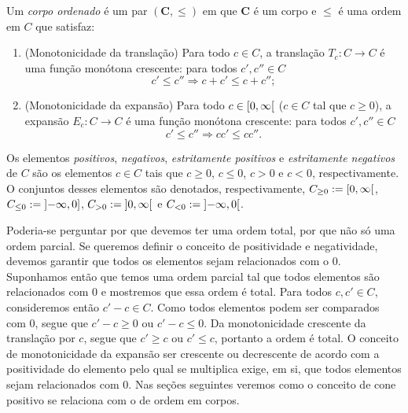 \begin{definition}
Um \emph{corpo ordenado} é um par $(\bm C, \leq)$ em que $\bm C$ é um corpo e $\leq$ é uma ordem em $C$ que satisfaz:
	\begin{enumerate}
	\item (Monotonicidade da translação) Para todo $c \in C$, a translação $T_c\colon C \to C$ é uma função monótona crescente: para todos $c',c'' \in C$
		\begin{equation*}
		c' \leq c'' \Rightarrow c+c' \leq c+c'';
		\end{equation*}
	\item (Monotonicidade da expansão) Para todo $c \in \left[{0},{\infty}\right[$ ($c \in C$ tal que $c \geq 0$), a expansão $E_c\colon C \to C$ é uma função monótona crescente: para todos $c',c'' \in C$
		\begin{equation*}
		c' \leq c'' \Rightarrow cc' \leq cc''.
		\end{equation*}
 	\end{enumerate}
Os elementos \emph{positivos}, \emph{negativos}, \emph{estritamente positivos} e \emph{estritamente negativos} de $C$ são os elementos $c \in C$ tais que $c \geq 0$, $c \leq 0$, $c>0$ e $c<0$, respectivamente. O conjuntos desses elementos são denotados, respectivamente, $C_{\geq 0} := \left[{0},{\infty}\right[$, $C_{\leq 0} := \left]{-\infty},{0}\right]$, $C_{> 0} := \left]{0},{\infty}\right[$ e $C_{< 0} := \left]{-\infty},{0}\right[$.
\end{definition}

Poderia-se perguntar por que devemos ter uma ordem total, por que não só uma ordem parcial. Se queremos definir o conceito de positividade e negatividade, devemos garantir que todos os elementos sejam relacionados com o $0$. Suponhamos então que temos uma ordem parcial tal que todos elementos são relacionados com $0$ e mostremos que essa ordem é total. Para todos $c,c' \in C$, consideremos então $c'-c \in C$. Como todos elementos podem ser comparados com $0$, segue que $c'-c \geq 0$ ou $c'-c \leq 0$. Da monotonicidade crescente da translação por $c$, segue que $c' \geq c$ ou $c' \leq c$, portanto a ordem é total. O conceito de monotonicidade da expansão ser crescente ou decrescente de acordo com a positividade do elemento pelo qual se multiplica exige, em si, que todos elementos sejam relacionados com $0$. Nas seções seguintes veremos como o conceito de cone positivo se relaciona com o de ordem em corpos.

